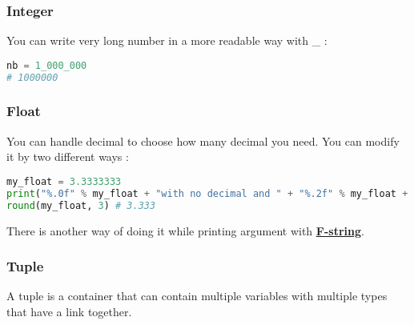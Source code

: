 \documentclass[a4paper, 12pt, titlepage]{scrartcl} %
\begin{document}
\subsubsection{Integer}
You can write very long number in a more readable way with \_ : 
\begin{lstlisting}[language=Python]
nb = 1_000_000
# 1000000
\end{lstlisting} \vspace{5mm}

\subsubsection{Float}
You can handle decimal to choose how many decimal you need. You can modify it by two different ways : 
\begin{lstlisting}[language=Python]
my_float = 3.3333333
print("%.0f" % my_float + "with no decimal and " + "%.2f" % my_float + "with two decimals") #3 with no decimal and 3.33 with two decimals
round(my_float, 3) # 3.333
\end{lstlisting} \vspace{5mm}

There is another way of doing it while printing argument with \hyperref[subsec:F-string]{\textbf{F-string}}.

\subsubsection{Tuple}
A tuple is a container that can contain multiple variables with multiple types that have a link together. 
\end{document}
